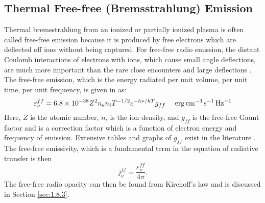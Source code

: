 \subsection{Thermal Free-free (Bremsstrahlung) Emission}\label{sec:1.7.1}
Thermal bremsstrahlung from an ionized or partially ionized plasma is often called free-free emission because it is produced by free electrons which are deflected off ions without being captured. For free-free radio emission, the distant Coulomb interactions of electrons with ions, which cause small angle deflections, are much more important than the rare close encounters and large deflections \citep{dulk_1985}. The free-free emission, which is the energy radiated per unit volume, per unit time, per unit frequency, is given in \cite{rybicki_1979} as:
\begin{equation}\label{eq:1.7.1}
\varepsilon _{\nu} ^{ff} = 6.8 \times 10^{-38}Z^{2}n_{e}n_{i}T^{-1/2}e^{-h\nu /kT}g_{ff}\ \ \ \ \rm{erg}\,\rm{cm}^{-3}\,s^{-1}\,\rm{Hz}^{-1}
\end{equation}
Here, $Z$ is the atomic number, $n_{i}$ is the ion density, and $g_{ff}$ is the free-free Gaunt factor and is a correction factor which is a function of electron energy and frequency of emission. Extensive tables and graphs of $g_{ff}$ exist in the literature \citep[e.g.,][]{karzas_1961}. The free-free emissivity, which is a fundamental term in the equation of radiative transfer is then
\begin{equation}\label{eq:1.7.2a}
j_{\nu} ^{ff}=\frac{\varepsilon _{\nu} ^{ff}}{4\pi}.
\end{equation}
The free-free radio opacity can then be found from Kirchoff's law and is discussed in Section \ref{sec:1.8.3}.

